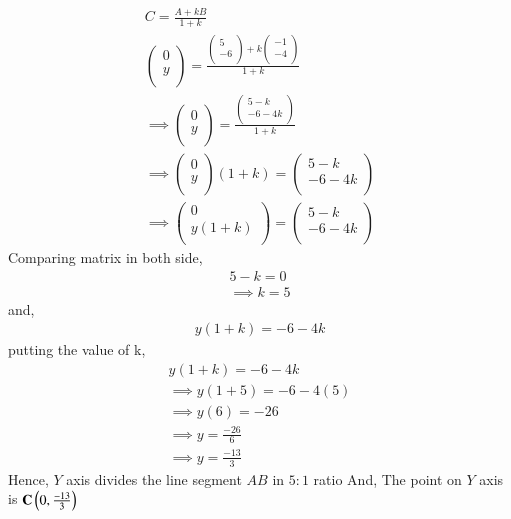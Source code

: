 \documentclass[journal]{IEEEtran}
\numberwithin{equation}{enumi}
\numberwithin{figure}{enumi}
\begin{document}
 \begin{align*}
 C=\frac{A+kB}{1+k}\\
 \begin{pmatrix} 0 \\ y \\ \end{pmatrix} =
 \frac{\begin{pmatrix} 5 \\ -6 \\ \end{pmatrix} + k\begin{pmatrix} -1 \\ -4 \\ \end{pmatrix}}{1+k}\\
 \implies \begin{pmatrix} 0 \\ y \\ \end{pmatrix} =
 \frac{\begin{pmatrix} 5-k \\ -6-4k \\ \end{pmatrix}}{1+k}\\
 \implies \begin{pmatrix} 0 \\ y \\ \end{pmatrix}(1+k) = 
 \begin{pmatrix} 5-k \\ -6-4k \\ \end{pmatrix}\\
 \implies \begin{pmatrix} 0 \\ y(1+k) \\ \end{pmatrix} =
 \begin{pmatrix} 5-k \\ -6-4k \\ \end{pmatrix}
 \end{align*}
 Comparing matrix in both side,
 \begin{align*}
 5-k=0\\
 \implies k=5
 \end{align*}
 and,
 \begin{align*}
     y(1+k)=-6-4k
 \end{align*}
 putting the value of k,
 \begin{align*}
y(1+k)=-6-4k\\
 \implies y(1+5)=-6-4(5)\\
 \implies y(6)=-26\\
 \implies y=\frac{-26}{6}\\
 \implies y=\frac{-13}{3}
 \end{align*}
 Hence, $Y$ axis divides the line segment $AB$ in $5:1$ ratio
 And,
 The point on $Y$ axis is $\mathbf{C}\left(0,\frac{-13}{3}\right)$
\end{document}
